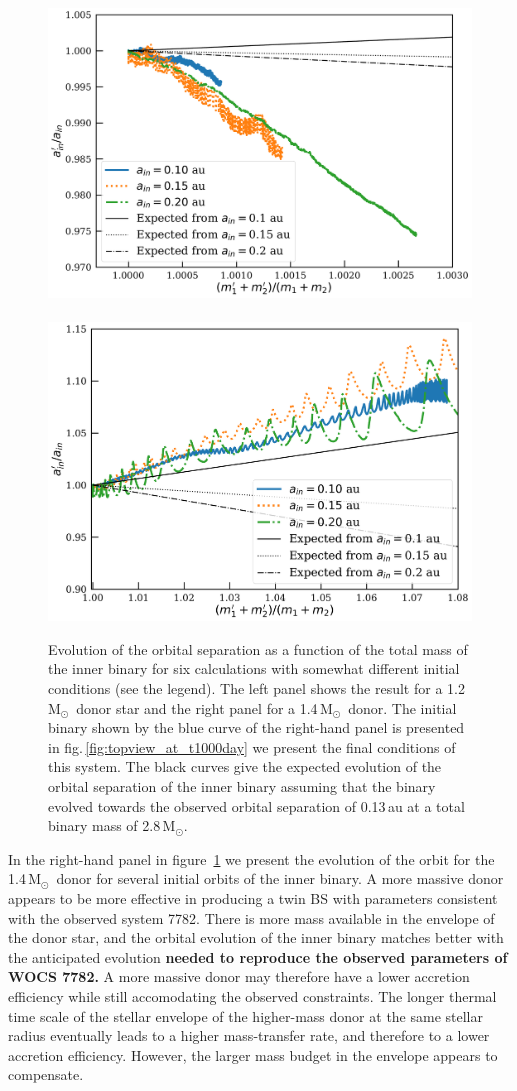 \documentclass[twocolumn]{aastex62}
\newcommand{\MSun}{\mbox{M$_\odot$}}
\begin{document}
\begin{figure}[ht!]
  \includegraphics[width=0.51\linewidth]{fig_orbital_evolution_for_12MSun.pdf}
~  \includegraphics[width=0.49\linewidth]{fig_orbital_evolution_for_14MSun.pdf}
  \caption{Evolution of the orbital separation as a function of the
    total mass of the inner binary for six calculations with somewhat
    different initial conditions (see the legend). The left panel
    shows the result for a 1.2\,\MSun\, donor star and the right panel
    for a 1.4\,\MSun\, donor. The initial binary shown by the blue
    curve of the right-hand panel is presented in
    fig.\,\ref{fig:topview_at_t1000day} we present the final
    conditions of this system.  The black curves give the expected
    evolution of the orbital separation of the inner binary assuming
    that the binary evolved towards the observed orbital separation of
    0.13\,au at a total binary mass of 2.8\,\MSun.
\label{fig:mass_vs_semimajor_axis}}
\end{figure}

In the right-hand panel in figure~\ref{fig:mass_vs_semimajor_axis} we
present the evolution of the orbit for the 1.4\,\MSun\, donor for
several initial orbits of the inner binary. A more massive donor
appears to be more effective in producing a twin BS with parameters
consistent with the observed system 7782. There is more mass available
in the envelope of the donor star, and the orbital evolution of the
inner binary matches better with the anticipated evolution
\textbf{needed to reproduce the observed parameters of WOCS 7782.}  A
more massive donor may therefore have a lower accretion efficiency
while still accomodating the observed constraints.  The longer thermal
time scale of the stellar envelope of the higher-mass donor at the
same stellar radius eventually leads to a higher mass-transfer rate,
and therefore to a lower accretion efficiency. However, the larger
mass budget in the envelope appears to compensate.
\end{document}
